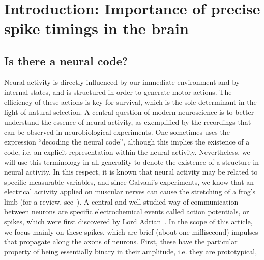 \documentclass[brainsci, %
               review,submit,pdftex,moreauthors
               ]{Definitions/mdpi}
\begin{document}
%
\section{Introduction: Importance of precise spike timings in the brain}\label{sec:time}
%
\subsection{Is there a neural code?}
Neural activity is directly influenced by our immediate environment and by internal states, and is structured in order to generate motor actions. The efficiency of these actions is key for survival, which is the sole determinant in the light of natural selection. A central question of modern neuroscience is to better understand the essence of neural activity, as exemplified by the recordings that can be observed in neurobiological experiments. One sometimes uses the expression ``decoding the neural code'', although this implies the existence of a code, i.e. an explicit representation within the neural activity. Nevertheless, we will use this terminology in all generality to denote the existence of a structure in neural activity. In this respect, it is known that neural activity may be related to specific measurable variables, and since Galvani's experiments, we know that an electrical activity applied on muscular nerves can cause the stretching of a frog's limb (for a review, see~\citep{piccolino_luigi_1997}). A central and well studied way of communication between neurons are specific electrochemical events called action potentials, or spikes, which were first discovered by \href{https://en.wikipedia.org/wiki/Edgar_Adrian}{Lord Adrian}~\citep{adrian_impulses_1926}. In the scope of this article, we focus mainly on these spikes, which are brief (about one millisecond) impulses that propagate along the axons of neurons. First, these have the particular property of being essentially binary in their amplitude, i.e. they are prototypical, 
\end{document}
